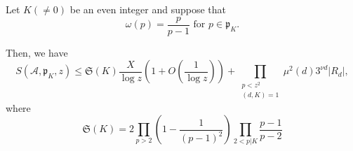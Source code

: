 \begin{theorem}\label{chap9-thm9.3}%
Let $K(\neq 0)$ be an even integer and suppose that 
\begin{equation*}
\omega(p) = \frac{p}{p-1} \text{ for } p \in
\mathfrak{p}_K.\tag{9.40}\label{eq9.40} 
\end{equation*}

Then, we have 
\begin{equation*}
S(\mathscr{A},\mathfrak{p}_K,z) \leq \mathfrak{S} (K) \frac{X}{\log
  z}(1+O(\frac{1}{\log z}))+ \prod \limits_{\substack{p< z^2 \\ (d,K)
    =1}} \mu^2 (d) 3^{\nu d}|R_d|,\tag{9.41}\label{eq9.41} 
\end{equation*}
where 
\begin{equation*}
\mathfrak{S}(K) = 2 \prod_{p>2}(1-\frac{1}{(p-1)^2})  \prod_{2<p|K}
\frac{p-1}{p-2}\tag{9.42}\label{eq9.42} 
\end{equation*}
\end{theorem}

